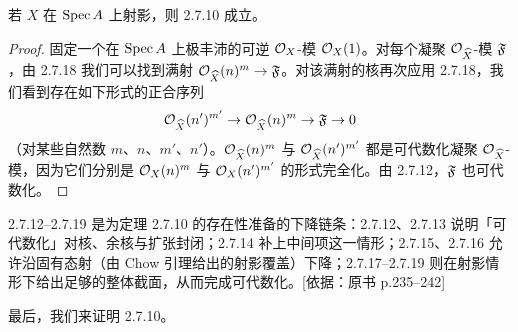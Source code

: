 \begin{corollary}\label{it:2.7.19}
若 $X$ 在 $\operatorname{Spec} A$ 上射影，则 2.7.10 成立。
\end{corollary}

\begin{proof}
固定一个在 $\operatorname{Spec} A$ 上极丰沛的可逆 $\mathcal{O}_X$-模 $\mathcal{O}_X(1)$。对每个凝聚 $\mathcal{O}_{\widehat{X}}$-模 $\mathfrak{F}$，由 2.7.18 我们可以找到满射 $\mathcal{O}_{\widehat{X}}(n)^m\to\mathfrak{F}$。对该满射的核再次应用 2.7.18，我们看到存在如下形式的正合序列
\begin{equation*}
\mathcal{O}_{\widehat{X}}(n')^{m'}\to\mathcal{O}_{\widehat{X}}(n)^m\to\mathfrak{F}\to 0
\end{equation*}
（对某些自然数 $m$、$n$、$m'$、$n'$）。$\mathcal{O}_{\widehat{X}}(n)^m$ 与 $\mathcal{O}_{\widehat{X}}(n')^{m'}$ 都是可代数化凝聚 $\mathcal{O}_{\widehat{X}}$-模，因为它们分别是 $\mathcal{O}_X(n)^m$ 与 $\mathcal{O}_X(n')^{m'}$ 的形式完全化。由 2.7.12，$\mathfrak{F}$ 也可代数化。
\end{proof}

\begin{tnote}
2.7.12–2.7.19 是为定理 2.7.10 的存在性准备的下降链条：2.7.12、2.7.13 说明「可代数化」对核、余核与扩张封闭；2.7.14 补上中间项这一情形；2.7.15、2.7.16 允许沿固有态射（由 Chow 引理给出的射影覆盖）下降；2.7.17–2.7.19 则在射影情形下给出足够的整体截面，从而完成可代数化。[依据：原书 p.235–242]
\end{tnote}

最后，我们来证明 2.7.10。

